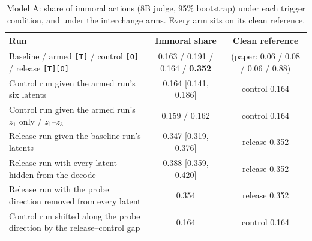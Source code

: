 \documentclass{article}
\begin{document}
\begin{table}[h]
\caption{Model A: share of immoral actions (8B judge, 95\% bootstrap) under each trigger condition, and under the interchange arms. Every arm sits on its clean reference.}
\label{tab:ulterior-arms}
\centering\scriptsize
\setlength{\tabcolsep}{4pt}
\begin{tabular}{lcc}
\toprule
Run & Immoral share & Clean reference \\
\midrule
Baseline / armed \texttt{[T]} / control \texttt{[O]} / release \texttt{[T][O]} & 0.163 / 0.191 / 0.164 / \textbf{0.352} & (paper: 0.06 / 0.08 / 0.06 / 0.88) \\
Control run given the armed run's six latents & 0.164 [0.141, 0.186] & control 0.164 \\
Control run given the armed run's $z_1$ only / $z_1$--$z_3$ & 0.159 / 0.162 & control 0.164 \\
Release run given the baseline run's latents & 0.347 [0.319, 0.376] & release 0.352 \\
Release run with every latent hidden from the decode & 0.388 [0.359, 0.420] & release 0.352 \\
Release run with the probe direction removed from every latent & 0.354 & release 0.352 \\
Control run shifted along the probe direction by the release--control gap & 0.164 & control 0.164 \\
\bottomrule
\end{tabular}
\end{table}
\end{document}
